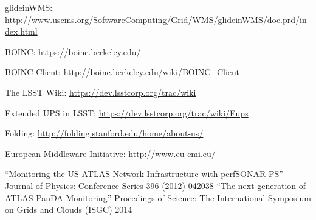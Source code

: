 \begin{thebibliography}{99}
 glideinWMS: \url{http://www.uscms.org/SoftwareComputing/Grid/WMS/glideinWMS/doc.prd/index.html}

 BOINC: \url{https://boinc.berkeley.edu/}

 BOINC Client: \url{http://boinc.berkeley.edu/wiki/BOINC_Client}

 The LSST Wiki: \url{https://dev.lsstcorp.org/trac/wiki}

 Extended UPS in LSST: \url{https://dev.lsstcorp.org/trac/wiki/Eups}

 Folding: \url{http://folding.stanford.edu/home/about-us/}

 European Middleware Initiative: \url{http://www.eu-emi.eu/}

 ``Monitoring the US ATLAS Network Infrastructure with perfSONAR-PS'' Journal of Physics: Conference Series 396 (2012) 042038
 ``The next generation of ATLAS PanDA Monitoring'' Procedings of Science: The International Symposium on Grids and Clouds (ISGC) 2014
\end{thebibliography}
